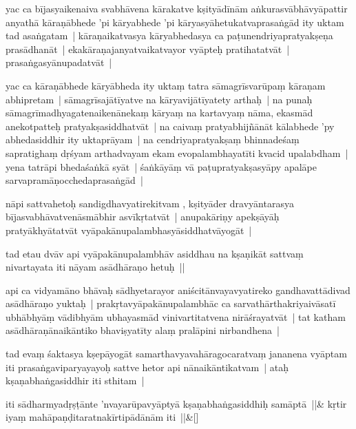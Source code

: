 \documentclass[article,a4paper]{memoir}
\begin{document}
	  \pstart yac ca bī\-jasyaikenaiva svabhā\-vena kā\-rakatve kṣityā\-dī\-nā\-m aṅkurasvā\-bhā\-vyā\-pattir anyathā\- kā\-raṇā\-bhede 'pi kā\-ryabhede 'pi kā\-ryasyā\-hetukatvaprasaṅgā\-d ity uktam tad asaṅgatam | kā\-raṇaikatvasya kā\-ryabhedasya ca paṭunendriyapratyakṣeṇa prasā\-dhanā\-t | ekakā\-raṇajanyatvaikatvayor vyā\-pteḥ pratihatatvā\-t | prasaṅgasyā\-nupadatvā\-t |
	\pend
      

	  \pstart yac ca kā\-raṇā\-bhede kā\-ryā\-bheda ity uktaṃ tatra sā\-magrī\-svarū\-paṃ kā\-raṇam abhipretam | sā\-magrī\-sajā\-tī\-yatve na kā\-ryavijā\-tī\-yatety arthaḥ | na punaḥ sā\-magrī\-madhyagatenaikenā\-nekaṃ kā\-ryaṃ na kartavyaṃ nā\-ma, ekasmā\-d anekotpatteḥ pratyakṣasiddhatvā\-t | na caivaṃ pratyabhijñā\-nā\-t kā\-labhede 'py abhedasiddhir ity uktaprā\-yam | na cendriyapratyakṣaṃ bhinnadeśaṃ sapratighaṃ dṛśyam arthadvayam ekam evopalambhayatī\-ti kvacid upalabdham | yena tatrā\-pi bhedaśaṅkā\- syā\-t | śaṅkā\-yā\-ṃ vā\- paṭupratyakṣasyā\-py apalā\-pe sarvapramā\-ṇocchedaprasaṅgā\-d |
	\pend
      

	  \pstart nā\-pi sattvahetoḥ sandigdhavyatirekitvam , kṣityā\-der dravyā\-ntarasya bī\-jasvabhā\-vatvenā\-smā\-bhir asvī\-kṛtatvā\-t | anupakā\-riṇy apekṣā\-yā\-ḥ pratyā\-khyā\-tatvā\-t vyā\-pakā\-nupalambhasyā\-siddhatvā\-yogā\-t |
	\pend
      

	  \pstart tad etau dvā\-v api vyā\-pakā\-nupalambhā\-v asiddhau na kṣaṇikā\-t sattvaṃ nivartayata iti nā\-yam asā\-dhā\-raṇo hetuḥ ||
	\pend
      

	  \pstart api ca vidyamā\-no bhā\-vaḥ sā\-dhyetarayor aniścitā\-nvayavyatireko gandhavattā\-divad asā\-dhā\-raṇo yuktaḥ | prakṛtavyā\-pakā\-nupalambhā\-c ca sarvathā\-rthakriyaivā\-satī\- ubhā\-bhyā\-ṃ vā\-dibhyā\-m ubhayasmā\-d vinivartitatvena nirā\-śrayatvā\-t | tat katham asā\-dhā\-raṇā\-naikā\-ntiko bhaviṣyatī\-ty alaṃ pralā\-pini nirbandhena |
	\pend
      

	  \pstart tad evaṃ śaktasya kṣepā\-yogā\-t samarthavyavahā\-ragocaratvaṃ jananena vyā\-ptam iti prasaṅgaviparyayayoḥ sattve hetor api nā\-naikā\-ntikatvam | ataḥ kṣaṇabhaṅgasiddhir iti sthitam |
	\pend
      
	    
	    \stanza[\smallbreak]
\label{thakur75-82.15} iti sā\-dharmyadṛṣṭā\-nte 'nvayarū\-pavyā\-ptyā\- kṣaṇabhaṅgasiddhiḥ samā\-ptā\- ||&\label{thakur75-82.17} kṛtir iyaṃ mahā\-paṇḍitaratnakī\-rtipā\-dā\-nā\-m iti ||\&[\smallbreak]


	
	  
	
\end{document}
